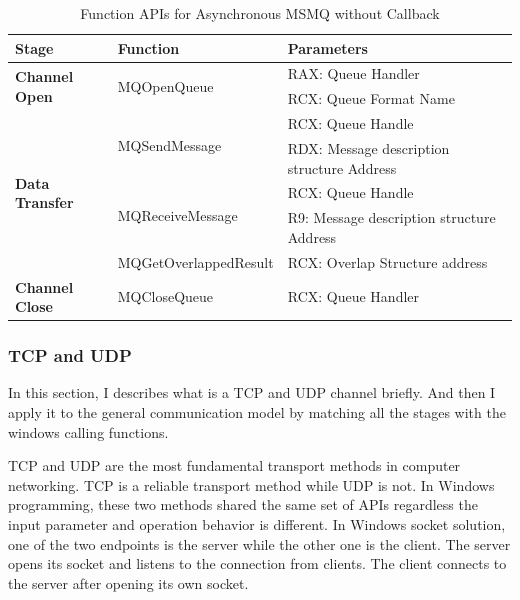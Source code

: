     \begin{table}[H]
        \centering
        \caption{Function APIs for Asynchronous MSMQ without Callback}
        \label{msmqasynfunctions}
        \begin{tabular}{|l|l|l|}
            \hline
             \textbf{Stage} & \textbf{Function}& \textbf{Parameters}  \\
             \hline
             \multirow{2}{*}{{\textbf{Channel Open}}}
             &\multirow{2}{*}{{MQOpenQueue}} &  RAX: Queue Handler\\
              \cline{3-3} 
             & &  RCX: Queue Format Name\\
            \hline
             \multirow{5}{*}{{\textbf{Data Transfer}}}
             &\multirow{2}{*}{MQSendMessage} &  RCX: Queue Handle \\
              \cline{3-3} 
             &&  RDX: Message description structure Address \\
            \cline{2-3}
             & \multirow{2}{*}{MQReceiveMessage}&  RCX: Queue Handle \\
              \cline{3-3} 
              &&  R9: Message description structure Address \\
                          \cline{2-3}
                          
              & MQGetOverlappedResult &  RCX: Overlap Structure address  \\
            \hline
            \textbf{Channel Close} &MQCloseQueue & RCX: Queue Handler \\
            \hline
        \end{tabular}
    \end{table}
    
\subsubsection{TCP and UDP}
In this section, I describes what is a TCP and UDP channel briefly. And then I apply it to the general communication model by matching all the stages with the windows calling functions.

TCP and UDP are the most fundamental transport methods in computer networking. TCP is a reliable transport method while UDP is not. In Windows programming, these two methods shared the same set of APIs regardless the input parameter and operation behavior is different. In Windows socket solution, one of the two endpoints is the server while the other one is the client. The server opens its socket and listens to the connection from clients. The client connects to the server after opening its own socket. 

